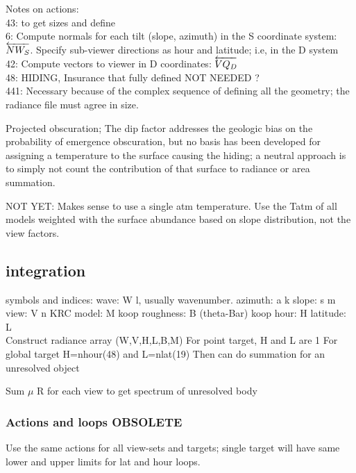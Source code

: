 \documentclass{article}
\begin{document}
Notes on actions: 
\\ 43: to get sizes  and define 
\\ 6: Compute normals for each tilt (slope, azimuth) in the S coordinate system: $\overleftarrow{NW_S}$. 
\qi Specify sub-viewer directions as hour and latitude; i.e, in the D system
\\ 42: Compute vectors to viewer in D coordinates: $\overleftarrow{VQ_D}$
\\ 48: HIDING, Insurance that  fully defined  NOT NEEDED ?
\\ 441: Necessary because of the complex sequence of defining all the geometry; the radiance file must agree in size.


\vspace{3mm} Projected obscuration; The dip factor addresses the geologic bias
on the probability of emergence obscuration, but no basis has been developed for
assigning a temperature to the surface causing the hiding; a neutral approach is
to simply not count the contribution of that surface to radiance or area
summation.

\vspace{3mm} NOT YET: Makes sense to use a single atm temperature. Use the Tatm
of all models weighted with the surface abundance based on slope distribution,
not the view factors.

\subsection{integration}
symbols and indices:
\qi wave: W l, usually wavenumber.
\qi azimuth: a k 
\qi slope: s m
\qi view:  V n
\qi KRC model: M koop
\qi roughness: B (theta-Bar) koop
\qi hour: H
\qi latitude: L
\\ Construct radiance array (W,V,H,L,B,M) 
\qi For point target, H and L are 1
\qi For global target H=nhour(48) and L=nlat(19)
\qii Then can do summation for an unresolved object

Sum $\mu$ R for each view to get spectrum of unresolved body

\pagebreak
\subsubsection{Actions and loops  OBSOLETE}  %
Use the same actions for all view-sets and targets; single target will have same lower and upper limits for lat and hour loops. 
\end{document}
